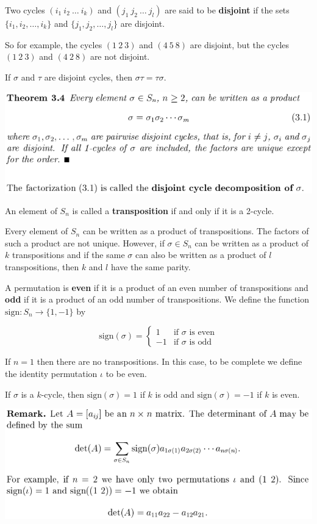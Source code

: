 \documentclass{article}
\begin{document}
Two cycles \((i_1 \ i_2 \ \ldots \ i_k)\) and \((j_1 \ j_2 \ \ldots \ j_l)\) are said to be \textbf{disjoint} if the sets \(\{i_1, i_2, \ldots, i_k\}\) and \(\{j_1, j_2, \ldots, j_l\}\) are disjoint.

So for example, the cycles \((1 \ 2 \ 3)\) and \((4 \ 5 \ 8)\) are disjoint, but the cycles \((1 \ 2 \ 3)\) and \((4 \ 2 \ 8)\) are not disjoint.

If \(\sigma\) and \(\tau\) are disjoint cycles, then \(\sigma \tau = \tau \sigma\).

\includegraphics[scale=0.45]{disjoint_cycle_decomp}

An element of \(S_n\) is called a \textbf{transposition} if and only if it is a 2-cycle. 

Every element of \(S_n\) can be written as a product of transpositions. The factors of such a product are not unique. However, if \(\sigma \in S_n\) can be written as a product of \(k\) transpositions and if the same \(\sigma\) can also be written as a product of \(l\) transpositions, then \(k\) and \(l\) have the same parity.

A permutation is \textbf{even} if it is a product of an even number of transpositions and \textbf{odd} if it is a product of an odd number of transpositions. We define the function \(\text{sign} : S_n \to \{1, -1\}\) by 

\[
\text{sign}(\sigma) = \begin{cases} 
     1 & \text{if } \sigma \text{ is even} \\
     -1 & \text{if } \sigma \text{ is odd}
   \end{cases}
\]

If \(n = 1\) then there are no transpositions. In this case, to be complete we define the identity permutation \(\iota\) to be even.

If \(\sigma\) is a \(k\)-cycle, then \(\text{sign}(\sigma) = 1\) if \(k\) is odd and \(\text{sign}(\sigma) = -1\) if \(k\) is even.

\includegraphics[scale=0.45]{determinant}
\end{document}
